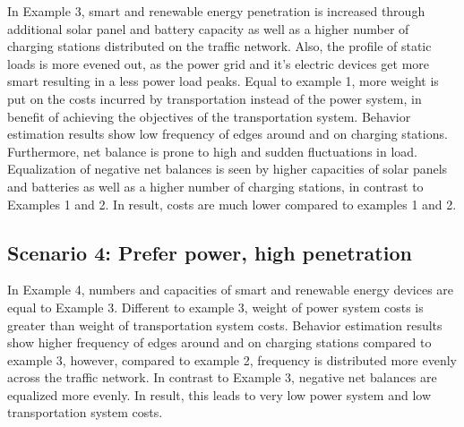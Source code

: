 In Example 3, smart and renewable energy penetration is increased through additional solar panel and battery capacity as well as a higher number of charging stations distributed on the traffic network. Also, the profile of static loads is more evened out, as the power grid and it's electric devices get more smart resulting in a less power load peaks. 
Equal to example 1, more weight is put on the costs incurred by transportation instead of the power system, in benefit of achieving the objectives of the transportation system. Behavior estimation results show low frequency of edges around and on charging stations. Furthermore, net balance is prone to high and sudden fluctuations in load. Equalization of negative net balances is seen by higher capacities of solar panels and batteries as well as a higher number of charging stations, in contrast to Examples 1 and 2. In result, costs are much lower compared to examples 1 and 2.

\subsection*{Scenario 4: Prefer power, high penetration}

In Example 4, numbers and capacities of smart and renewable energy devices are equal to Example 3. Different to example 3, weight of power system costs is greater than weight of transportation system costs. Behavior estimation results show higher frequency of edges around and on charging stations compared to example 3, however, compared to example 2, frequency is distributed more evenly across the traffic network. In contrast to Example 3, negative net balances are equalized more evenly. In result, this leads to very low power system and low transportation system costs.